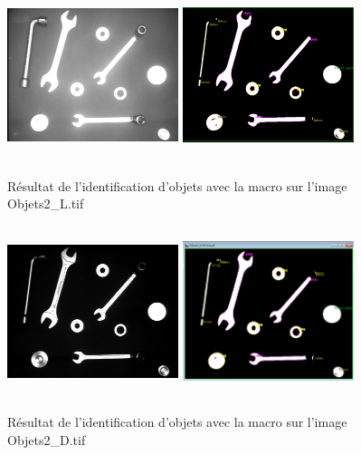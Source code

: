 \documentclass{scrreprt}
\begin{document}
\begin{figure}[!h]
\centering
\includegraphics[width=5cm, height=5cm]{images/objet2Lo.png}\hfill
\includegraphics[width=5cm, height=5cm]{images/objet2L.png}
\caption{Résultat de l'identification d'objets avec la macro sur l'image Objets2_L.tif}
\end{figure}


\begin{figure}[!h]
\centering
\includegraphics[width=5cm, height=5cm]{images/objet2Do.png}\hfill
\includegraphics[width=5cm, height=5cm]{images/objet2D.png}
\caption{Résultat de l'identification d'objets avec la macro sur l'image Objets2_D.tif}
\end{figure}
\end{document}
